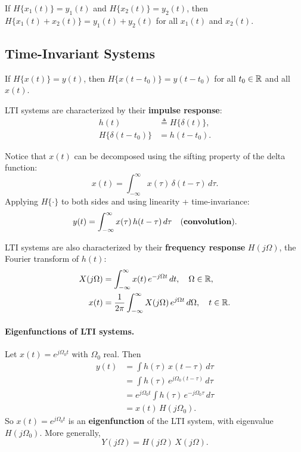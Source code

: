 \documentclass[handout_subfiles_root.tex]{subfiles}
\begin{document}
\begin{defbox}[title={Definition (Additivity)}]
If $H\{x_1(t)\} = y_1(t)$ and $H\{x_2(t)\} = y_2(t)$, then
$H\{x_1(t) + x_2(t)\} = y_1(t) + y_2(t)$ for all $x_1(t)$ and $x_2(t)$.
\end{defbox}

\subsection{Time-Invariant Systems}

\begin{defbox}[title={Definition (Time-Invariance)}]
If $H\{x(t)\} = y(t)$, then $H\{x(t-t_0)\} = y(t-t_0)$ for all $t_0 \in \mathbb{R}$
and all $x(t)$.
\end{defbox}


LTI systems are characterized by their \textbf{impulse response}:
\begin{align*}
  h(t) &\triangleq H\{\delta(t)\}, \\
  H\{\delta(t-t_0)\} &= h(t-t_0).
\end{align*}

Notice that $x(t)$ can be decomposed using the sifting property of the delta
function:
$$x(t) = \int_{-\infty}^{\infty} x(\tau)\,\delta(t-\tau)\,d\tau.$$
Applying $H\{\cdot\}$ to both sides and using linearity + time-invariance:
$$y(t) = \int_{-\infty}^{\infty} x(\tau)\,h(t-\tau)\,d\tau \quad
  \text{(\textbf{convolution})}.$$


LTI systems are also characterized by their \textbf{frequency response}
$H(j\Omega)$, the Fourier transform of $h(t)$:
\begin{align*}
  X(j\Omega) &= \int_{-\infty}^{\infty} x(t)\,e^{-j\Omega t}\,dt,
    \quad \Omega\in\mathbb{R}, \\
  x(t) &= \frac{1}{2\pi}\int_{-\infty}^{\infty} X(j\Omega)\,e^{j\Omega t}\,d\Omega,
    \quad t\in\mathbb{R}.
\end{align*}

\paragraph{Eigenfunctions of LTI systems.} Let $x(t) = e^{j\Omega_0 t}$ with
$\Omega_0$ real. Then
\begin{align*}
  y(t) &= \int h(\tau)\,x(t-\tau)\,d\tau \\
  &= \int h(\tau)\,e^{j\Omega_0(t-\tau)}\,d\tau \\
  &= e^{j\Omega_0 t}\int h(\tau)\,e^{-j\Omega_0 \tau}\,d\tau \\
  &= x(t)\,H(j\Omega_0).
\end{align*}
\noindent{}So $x(t) = e^{j\Omega_0 t}$ is an \textbf{eigenfunction} of the LTI system,
with eigenvalue $H(j\Omega_0)$. More generally,
$$Y(j\Omega) = H(j\Omega)\,X(j\Omega).$$
\end{document}
